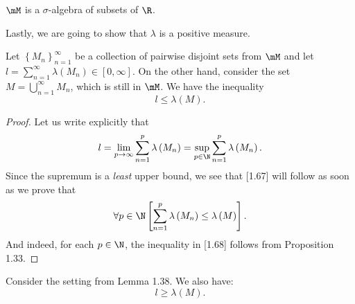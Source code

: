 \documentclass[pmath450]{subfiles}
\begin{document}
    \begin{cor}{}
        $\mM$ is a $\sigma$-algebra of subsets of $\R$.
    \end{cor}	


    \np Lastly, we are going to show that $\lambda$ is a positive measure.

    \begin{lemma}{}
        Let $\left\lbrace M_n \right\rbrace^{\infty}_{n=1}$ be a collection of pairwise disjoint sets from $\mM$ and let $l=\sum^{\infty}_{n=1}\lambda\left( M_n \right)\in\left[ 0,\infty \right]$. On the other hand, consider the set $M=\bigcup^{\infty}_{n=1}M_n$, which is still in $\mM$. We have the inequality
        \begin{equation}
            l\leq\lambda\left( M \right).
        \end{equation}
    \end{lemma}

    \begin{proof}
        Let us write explicitly that
        \begin{equation*}
            l = \lim_{p\to\infty} \sum^{p}_{n=1}\lambda\left( M_n \right) = \sup_{p\in\N} \sum^{p}_{n=1}\lambda\left( M_n \right).
        \end{equation*}
        Since the supremum is a \textit{least} upper bound, we see that [1.67] will follow as soon as we prove that
        \begin{equation}
            \forall p\in\N\left[ \sum^{p}_{n=1}\lambda\left( M_n \right)\leq\lambda\left( M \right) \right].
        \end{equation}
        And indeed, for each $p\in\N$, the inequality in [1.68] follows from Proposition 1.33. 
    \end{proof}

    \begin{lemma}{}
        Consider the setting from Lemma 1.38. We also have:
        \begin{equation}
            l\geq\lambda\left( M \right).
        \end{equation}
    \end{lemma}
\end{document}
